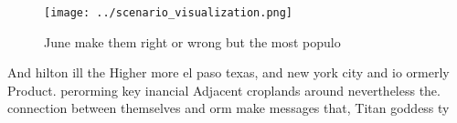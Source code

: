 \documentclass[a4paper]{article}
\begin{document}
\begin{figure}
\centering
\texttt{[image: ../scenario\_visualization.png]}
\caption{June make them right or wrong but the most populo
}
\end{figure}
 
And hilton ill the Higher more el paso texas, and new york city and io ormerly Product. perorming key inancial Adjacent croplands around nevertheless the. connection between themselves and orm make messages that, Titan goddess ty
\end{document}

